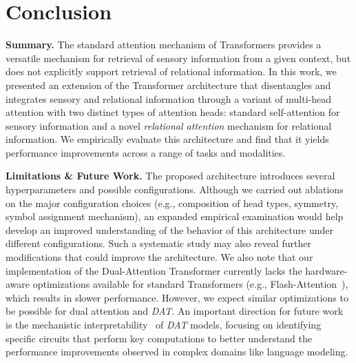 \section{Conclusion}\label{sec:discussion}

\textbf{Summary.} The standard attention mechanism of Transformers provides a versatile mechanism for retrieval of sensory information from a given context, but does not explicitly support retrieval of relational information. In this work, we presented an extension of the Transformer architecture that disentangles and integrates sensory and relational information through a variant of multi-head attention with two distinct types of attention heads: standard self-attention for sensory information and a novel \textit{relational attention} mechanism for relational information. We empirically evaluate this architecture and find that it yields performance improvements across a range of tasks and modalities.

\textbf{Limitations \& Future Work.} The proposed architecture introduces several hyperparameters and possible configurations. Although we carried out ablations on the major configuration choices (e.g., composition of head types, symmetry, symbol assignment mechanism), an expanded empirical examination would help develop an improved understanding of the behavior of this architecture under different configurations. Such a systematic study may also reveal further modifications that could improve the architecture. We also note that our implementation of the Dual-Attention Transformer currently lacks the hardware-aware optimizations available for standard Transformers (e.g., Flash-Attention~\citep{dao2022flashattention}), which results in slower performance. However, we expect similar optimizations to be possible for dual attention and \textit{DAT}. An important direction for future work is the mechanistic interpretability~\citep{elhage2021mathematical} of \textit{DAT} models, focusing on identifying specific circuits that perform key computations to better understand the performance improvements observed in complex domains like language modeling.